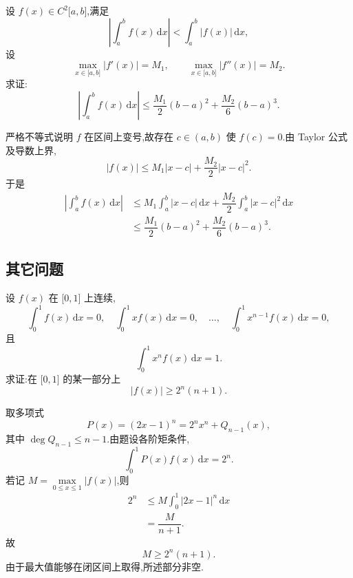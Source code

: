 \begin{example}
    设 $f(x)\in C^2\lbrack a,b\rbrack$,满足
    \[
        \left|\int_a^bf(x)\,\mathrm{d}x\right|
        <\int_a^b|f(x)|\,\mathrm{d}x,
    \]
    设
    \[
        \max\limits_{x\in\lbrack a,b\rbrack}|f'(x)|=M_1,
        \qquad
        \max\limits_{x\in\lbrack a,b\rbrack}|f''(x)|=M_2.
    \]
    求证:
    \[
        \left|\int_a^bf(x)\,\mathrm{d}x\right|
        \leq\dfrac{M_1}{2}(b-a)^2+\dfrac{M_2}{6}(b-a)^3.
    \]
\end{example}
\exampleblank

\begin{solution}
    严格不等式说明 $f$ 在区间上变号,故存在 $c\in(a,b)$ 使 $f(c)=0$.由 Taylor 公式及导数上界,
    \[
        |f(x)|
        \leq M_1|x-c|+\dfrac{M_2}{2}|x-c|^2.
    \]
    于是
    \[
        \begin{aligned}
            \left|\int_a^bf(x)\,\mathrm{d}x\right|
             & \leq M_1\int_a^b|x-c|\,\mathrm{d}x
            +\dfrac{M_2}{2}\int_a^b|x-c|^2\,\mathrm{d}x \\
             & \leq\dfrac{M_1}{2}(b-a)^2
            +\dfrac{M_2}{6}(b-a)^3.
        \end{aligned}
    \]
\end{solution}



\subsection{其它问题}

\begin{example}
    设 $f(x)$ 在 $\lbrack 0,1\rbrack$ 上连续,
    \[
        \displaystyle\int_0^1f(x)\,\mathrm{d}x=0,
        \quad
        \int_0^1xf(x)\,\mathrm{d}x=0,
        \quad\ldots,\quad
        \int_0^1x^{n-1}f(x)\,\mathrm{d}x=0,
    \]
    且
    \[
        \displaystyle\int_0^1x^n f(x)\,\mathrm{d}x=1.
    \]
    求证:在 $\lbrack 0,1\rbrack$ 的某一部分上
    \[
        |f(x)|\geq2^n(n+1).
    \]
\end{example}
\exampleblank

\begin{solution}
    取多项式
    \[
        P(x)=(2x-1)^n=2^nx^n+Q_{n-1}(x),
    \]
    其中 $\deg Q_{n-1}\leq n-1$.由题设各阶矩条件,
    \[
        \displaystyle\int_0^1P(x)f(x)\,\mathrm{d}x=2^n.
    \]
    若记 $M=\max\limits_{0\leq x\leq1}|f(x)|$,则
    \[
        \begin{aligned}
            2^n
             & \leq M\int_0^1|2x-1|^n\,\mathrm{d}x \\
             & =\dfrac{M}{n+1}.
        \end{aligned}
    \]
    故
    \[
        M\geq2^n(n+1).
    \]
    由于最大值能够在闭区间上取得,所述部分非空.
\end{solution}

